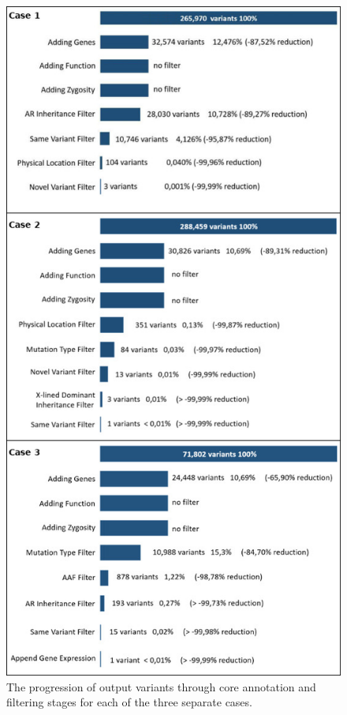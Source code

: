\documentclass{bioinfo}
\begin{document}
\begin{figure}[!tpb]
  \centerline{\includegraphics[natwidth=250bp,natheight=500bp]{control_result_total.jpg}}\caption{The progression of output variants through core annotation and filtering stages for each of the three separate cases.}\label{fig:result}
\end{figure}
\end{document}
